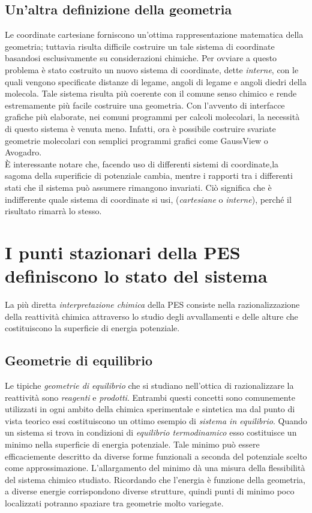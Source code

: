 \documentclass[oneside]{amsbook}
\numberwithin{section}{chapter}
\numberwithin{equation}{section}
\numberwithin{figure}{section}
\begin{document}
\subsection{Un'altra definizione della geometria}
Le coordinate cartesiane forniscono un'ottima rappresentazione matematica della geometria; tuttavia risulta difficile costruire un tale sistema di coordinate basandosi esclusivamente su considerazioni chimiche. Per ovviare a questo problema è stato costruito un nuovo sistema di coordinate, dette \emph{interne}, con le quali vengono specificate distanze di legame, angoli di legame e angoli diedri della molecola. Tale sistema risulta più coerente con il comune senso chimico e rende estremamente più facile costruire una geometria. Con l'avvento di interfacce grafiche più elaborate, nei comuni programmi per calcoli molecolari, la necessità di questo sistema è venuta meno. Infatti, ora è possibile costruire svariate geometrie molecolari con semplici programmi grafici come GaussView o Avogadro.\\
\`E interessante notare che, facendo uso di differenti sistemi di coordinate,la sagoma della superificie di potenziale cambia, mentre i rapporti tra i differenti stati che il sistema può assumere rimangono invariati. Ciò significa che è indifferente quale sistema di coordinate si usi, (\emph{cartesiane} o \emph{interne}), perché il risultato rimarrà lo stesso.
\section{I punti stazionari della PES definiscono lo stato del sistema}
La più diretta \emph{interpretazione chimica} della PES consiste nella razionalizzazione della reattività chimica attraverso lo studio degli avvallamenti e delle alture che costituiscono la superficie di energia potenziale.
\subsection{Geometrie di equilibrio}
Le tipiche \emph{geometrie di equilibrio} che si studiano nell'ottica di razionalizzare la reattività sono \emph{reagenti} e \emph{prodotti}.
Entrambi questi concetti sono comunemente utilizzati in ogni ambito della chimica sperimentale e sintetica ma dal punto di vista teorico essi costituiscono un ottimo esempio di \emph{sistema in equilibrio}. Quando un sistema si trova in condizioni di \emph{equilibrio termodinamico} esso costituisce un minimo nella superficie di energia potenziale. Tale minimo può essere efficaciemente descritto da diverse forme funzionali a seconda del potenziale scelto come approssimazione.
L'allargamento del minimo dà una misura della flessibilità del sistema chimico studiato. Ricordando che l'energia è funzione della geometria, a diverse energie corrispondono diverse strutture, quindi punti di minimo poco localizzati potranno spaziare tra geometrie molto variegate.
\end{document}
